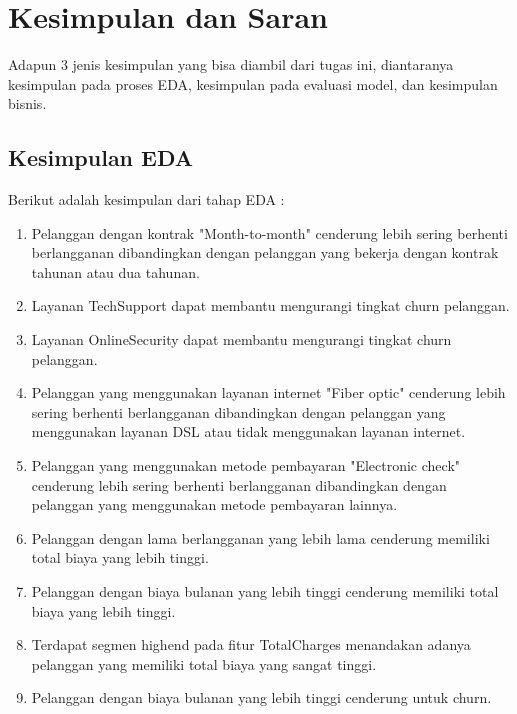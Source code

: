 \newpage
\section{Kesimpulan dan Saran}
Adapun 3 jenis kesimpulan yang bisa diambil dari tugas ini, diantaranya 
kesimpulan pada proses EDA, kesimpulan pada evaluasi model, dan kesimpulan bisnis. 

\subsection{Kesimpulan EDA}
Berikut adalah kesimpulan dari tahap EDA :
\begin{enumerate}
    \item Pelanggan dengan kontrak "Month-to-month" cenderung lebih sering berhenti berlangganan dibandingkan dengan pelanggan yang bekerja dengan kontrak tahunan atau dua tahunan.
    \item Layanan TechSupport dapat membantu mengurangi tingkat churn pelanggan.
    \item Layanan OnlineSecurity dapat membantu mengurangi tingkat churn pelanggan.
    \item Pelanggan yang menggunakan layanan internet "Fiber optic" cenderung lebih sering berhenti berlangganan dibandingkan dengan pelanggan yang menggunakan layanan DSL atau tidak menggunakan layanan internet.
    \item Pelanggan yang menggunakan metode pembayaran "Electronic check" cenderung lebih sering berhenti berlangganan dibandingkan dengan pelanggan yang menggunakan metode pembayaran lainnya.
    \item Pelanggan dengan lama berlangganan yang lebih lama cenderung memiliki total biaya yang lebih tinggi.
    \item Pelanggan dengan biaya bulanan yang lebih tinggi cenderung memiliki total biaya yang lebih tinggi.
    \item Terdapat segmen highend pada fitur TotalCharges menandakan adanya pelanggan yang memiliki total biaya yang sangat tinggi.
    \item Pelanggan dengan biaya bulanan yang lebih tinggi cenderung untuk churn.
\end{enumerate}

